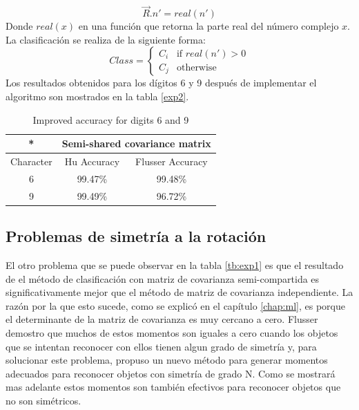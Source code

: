 \documentclass[a4paper, 11pt, oneside]{report}
\begin{document}
	\[ \vec{R}.n' = real(n') \]
Donde $real(x)$ en una función que retorna la parte real del número complejo $x$. La clasificación se realiza de la siguiente forma:
	\begin{equation}\label{angleClassif}
		Class = \left\{ \begin{array}{ll}
		C_i   & \mbox{if $real(n') > 0$} \\
		C_j & \mbox{otherwise}
	\end{array} \right. 
	\end{equation}
Los resultados obtenidos para los dígitos 6 y 9 después de implementar el algoritmo son mostrados en la tabla \ref{exp2}.	
	\begin{table}
	\begin{center}
	\begin{tabular}{|c|c|c|}
		\hline
		* & \multicolumn{2}{|c|}{Semi-shared covariance matrix} \\
		\hline
		Character & Hu Accuracy & Flusser Accuracy \\
		\hline
		6 & 99.47\% & 99.48\%	\\
		9 &	99.49\% & 96.72\% \\
		\hline
	\end{tabular}
	\end{center}
	\caption{Improved accuracy for digits 6 and 9}	
	\label{tb:exp2}
	\end{table}

\subsection{Problemas de simetría a la rotación}

El otro problema que se puede observar en la tabla \ref{tb:exp1} es que el resultado de el método de clasificación con matriz de covarianza semi-compartida es significativamente mejor que el método de matriz de covarianza independiente. La razón por la que esto sucede, como se explicó en el capítulo \ref{chap:ml}, es porque el determinante de la matriz de covarianza es muy cercano a cero. Flusser \cite{flusser06} demostro que muchos de estos momentos son iguales a cero cuando los objetos que se intentan reconocer con ellos tienen algun grado de simetría y, para solucionar este problema, propuso un nuevo método para generar momentos adecuados para reconocer objetos con simetría de grado N. Como se mostrará mas adelante estos momentos son también efectivos para reconocer objetos que no son simétricos.
\end{document}
